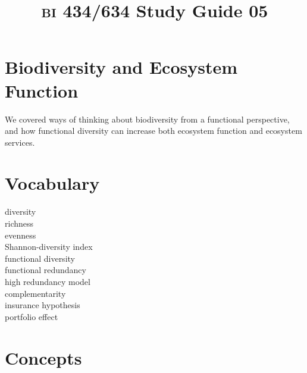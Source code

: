 \documentclass[letterpaper]{tufte-handout}
\title{{\scshape bi} 434/634 Study Guide 05}
\date{} %
\begin{document}
\maketitle	%

\section*{Biodiversity and Ecosystem Function}

We covered ways of thinking about biodiversity from a functional perspective, and how functional diversity can increase both ecosystem function and ecosystem services.

\section*{Vocabulary}

\vspace{-1\baselineskip}
\begin{multicols}{2}
diversity \\
richness \\
evenness \\
Shannon-diversity index \\
functional diversity \\
functional redundancy \\
high redundancy model \\
complementarity \\
insurance hypothesis \\
portfolio effect 
\end{multicols}

\section*{Concepts}
\end{document}
